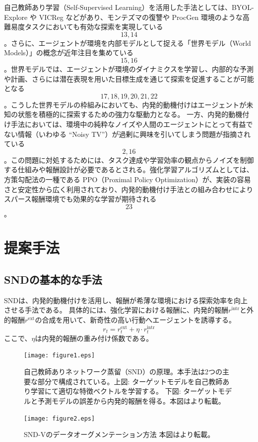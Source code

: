 自己教師あり学習（Self-Supervised Learning）を活用した手法としては、BYOL-Explore や VICReg などがあり、モンテズマの復讐や ProcGen 環境のような高難易度タスクにおいても有効な探索を実現している\[13, 14\]。さらに、エージェントが環境を内部モデルとして捉える「世界モデル（World Models）」の概念が近年注目を集めている\[15, 16\]。世界モデルでは、エージェントが環境のダイナミクスを学習し、内部的な予測や計画、さらには潜在表現を用いた目標生成を通じて探索を促進することが可能となる\[17, 18, 19, 20, 21, 22\]。こうした世界モデルの枠組みにおいても、内発的動機付けはエージェントが未知の状態を積極的に探索するための強力な駆動力となる。
一方、内発的動機付け手法においては、環境中の純粋なノイズや人間のエージェントにとって有益でない情報（いわゆる “Noisy TV”）が過剰に興味を引いてしまう問題が指摘されている\[2, 16\]。この問題に対処するためには、タスク達成や学習効率の観点からノイズを制御する仕組みや報酬設計が必要であるとされる。強化学習アルゴリズムとしては、方策勾配法の一種である PPO（Proximal Policy Optimization）が、実装の容易さと安定性から広く利用されており、内発的動機付け手法との組み合わせによりスパース報酬環境でも効果的な学習が期待される\[23\]。

\section{提案手法}
\subsection{SNDの基本的な手法}
SNDは、内発的動機付けを活用し、報酬が希薄な環境における探索効率を向上させる手法である。
具体的には、強化学習における報酬に、内発的報酬\(r^{\text{intr}}\)と外的報酬\(r^{\text{ext}}\)の合成を用いて、新奇性の高い行動へエージェントを誘導する。
\[
 r_t = r^{\text{ext}}_{t} + \eta \cdot r^{\text{intr}}_{t}
\]
ここで、\(\eta\)は内発的報酬の重み付け係数である。
\begin{figure}[t]
   \centering
   \texttt{[image: figure1.eps]}
   \caption{自己教師ありネットワーク蒸留（SND）の原理。本手法は2つの主要な部分で構成されている。上図: ターゲットモデルを自己教師あり学習にて適切な特徴ベクトルを学習する。 下図: ターゲットモデルと予測モデルの誤差から内発的報酬を得る。本図は\cite{SND}より転載。}\label{fig1:figure1}
\end{figure}
\begin{figure}[t]
   \centering
   \texttt{[image: figure2.eps]}
   \caption{SND-Vのデータオーグメンテーション方法 本図は\cite{SND}より転載。}\label{fig2:figure2}
\end{figure}


